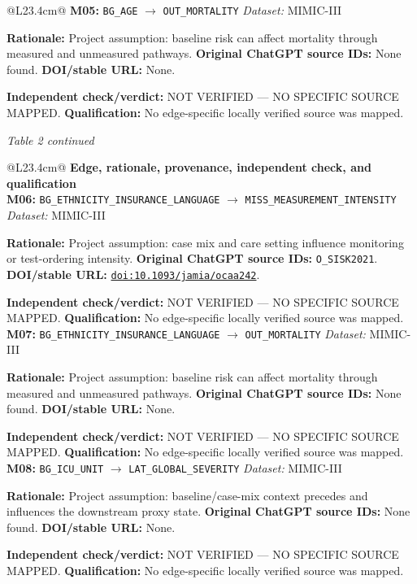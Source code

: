 \begin{tabular}{@{}L{23.4cm}@{}}
\addlinespace[2pt]
\midrule
\textbf{M05:} \nolinkurl{BG_AGE} $\rightarrow$ \nolinkurl{OUT_MORTALITY} \hfill \textit{Dataset:} MIMIC-III\par\textbf{Rationale:} Project assumption: baseline risk can affect mortality through measured and unmeasured pathways. \textbf{Original ChatGPT source IDs:} None found. \textbf{DOI/stable URL:} None.\par\textbf{Independent check/verdict:} NOT VERIFIED --- NO SPECIFIC SOURCE MAPPED. \textbf{Qualification:} No edge-specific locally verified source was mapped. \\
\addlinespace[2pt]
\midrule
\bottomrule
\end{tabular}
\clearpage
\textit{Table 2 continued}\par
\begin{tabular}{@{}L{23.4cm}@{}}
\toprule
\textbf{Edge, rationale, provenance, independent check, and qualification}\\
\midrule
\textbf{M06:} \nolinkurl{BG_ETHNICITY_INSURANCE_LANGUAGE} $\rightarrow$ \nolinkurl{MISS_MEASUREMENT_INTENSITY} \hfill \textit{Dataset:} MIMIC-III\par\textbf{Rationale:} Project assumption: case mix and care setting influence monitoring or test-ordering intensity. \textbf{Original ChatGPT source IDs:} \nolinkurl{O_SISK2021}. \textbf{DOI/stable URL:} \href{https://doi.org/10.1093/jamia/ocaa242}{\nolinkurl{doi:10.1093/jamia/ocaa242}}.\par\textbf{Independent check/verdict:} NOT VERIFIED --- NO SPECIFIC SOURCE MAPPED. \textbf{Qualification:} No edge-specific locally verified source was mapped. \\
\addlinespace[2pt]
\midrule
\textbf{M07:} \nolinkurl{BG_ETHNICITY_INSURANCE_LANGUAGE} $\rightarrow$ \nolinkurl{OUT_MORTALITY} \hfill \textit{Dataset:} MIMIC-III\par\textbf{Rationale:} Project assumption: baseline risk can affect mortality through measured and unmeasured pathways. \textbf{Original ChatGPT source IDs:} None found. \textbf{DOI/stable URL:} None.\par\textbf{Independent check/verdict:} NOT VERIFIED --- NO SPECIFIC SOURCE MAPPED. \textbf{Qualification:} No edge-specific locally verified source was mapped. \\
\addlinespace[2pt]
\midrule
\textbf{M08:} \nolinkurl{BG_ICU_UNIT} $\rightarrow$ \nolinkurl{LAT_GLOBAL_SEVERITY} \hfill \textit{Dataset:} MIMIC-III\par\textbf{Rationale:} Project assumption: baseline/case-mix context precedes and influences the downstream proxy state. \textbf{Original ChatGPT source IDs:} None found. \textbf{DOI/stable URL:} None.\par\textbf{Independent check/verdict:} NOT VERIFIED --- NO SPECIFIC SOURCE MAPPED. \textbf{Qualification:} No edge-specific locally verified source was mapped. \\

\end{tabular}
